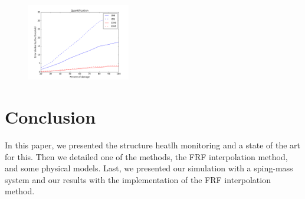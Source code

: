 \documentclass[journal]{IEEEtran}
\begin{document}
\begin{figure}[h!]
  \centering
  \includegraphics[width=0.4\textwidth]{images/quantification.png}
  \caption{}
  \label{quant}
\end{figure}


\section{Conclusion}

In this paper, we presented the structure heatlh monitoring and a state of the art for this. Then we detailed one of the methods, the FRF interpolation method, and some physical models. Last, we presented our simulation with a sping-mass system and our results with the implementation of the FRF interpolation method.





%
%

\nocite{*}
\printbibliography
\end{document}

